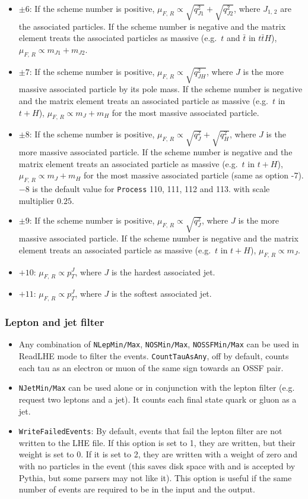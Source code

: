 \documentclass[aps,superscriptaddress,nofootinbib]{revtex4}
\newcommand{\eg}{e.g.~}
\begin{document}
\begin{itemize}
\begin{itemize}
		\item $\pm6$: If the scheme number is positive, $\mu_{F,\,R} \propto \sqrt{q^2_{J1}}+\sqrt{q^2_{J2}}$, where $J_{1,\,2}$ are the associated particles. If the scheme number is negative and the matrix element treats the associated particles as massive (\eg $t$ and $\bar{t}$ in $t\bar{t}H$), $\mu_{F,\,R} \propto m_{J1}+m_{J2}$.
		\item $\pm7$: If the scheme number is positive, $\mu_{F,\,R} \propto \sqrt{q^2_{JH}}$, where $J$ is the more massive associated particle by its pole mass. If the scheme number is negative and the matrix element treats an associated particle as massive (\eg $t$ in $t+H$), $\mu_{F,\,R} \propto m_{J}+m_{H}$ for the most massive associated particle.
		\item $\pm8$: If the scheme number is positive, $\mu_{F,\,R} \propto \sqrt{q^2_{J}}+\sqrt{q^2_{H}}$, where $J$ is the more massive associated particle. If the scheme number is negative and the matrix element treats an associated particle as massive (\eg $t$ in $t+H$), $\mu_{F,\,R} \propto m_{J}+m_{H}$ for the most massive associated particle (same as option -7).  $-8$ is the default value for \verb|Process| 110, 111, 112 and 113. with scale multiplier $0.25$.
		\item $\pm9$: If the scheme number is positive, $\mu_{F,\,R} \propto \sqrt{q^2_{J}}$, where $J$ is the more massive associated particle. If the scheme number is negative and the matrix element treats an associated particle as massive (\eg $t$ in $t+H$), $\mu_{F,\,R} \propto m_{J}$.
		\item $+10$: $\mu_{F,\,R} \propto p_T^J$, where $J$ is the hardest associated jet.
		\item $+11$: $\mu_{F,\,R} \propto p_T^J$, where $J$ is the softest associated jet.
	\end{itemize}
\end{itemize}
\subsubsection{Lepton and jet filter}
\begin{itemize}
\item Any combination of \verb|NLepMin/Max|, \verb|NOSMin/Max|, \verb|NOSSFMin/Max| can be used in ReadLHE mode to filter the events.  \verb|CountTauAsAny|, off by default, counts each tau as an electron or muon of the same sign towards an OSSF pair.
\item \verb|NJetMin/Max| can be used alone or in conjunction with the lepton filter (e.g. request two leptons and a jet).  It counts each final state quark or gluon as a jet.
\item \verb|WriteFailedEvents|: By default, events that fail the lepton filter are not written to the LHE file.  If this option is set to 1, they are written, but their weight is set to 0.  If it is set to 2, they are written with a weight of zero and with no particles in the event (this saves disk space with  and is accepted by Pythia, but some parsers may not like it).  This option is useful if the same number of events are required to be in the input and the output.
\end{itemize}
\end{document}
